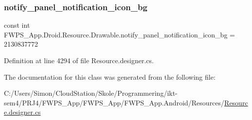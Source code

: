 \subsubsection{\texorpdfstring{notify\+\_\+panel\+\_\+notification\+\_\+icon\+\_\+bg}{notify\_panel\_notification\_icon\_bg}}
{\footnotesize\ttfamily const int F\+W\+P\+S\+\_\+\+App.\+Droid.\+Resource.\+Drawable.\+notify\+\_\+panel\+\_\+notification\+\_\+icon\+\_\+bg = 2130837772}



Definition at line 4294 of file Resource.\+designer.\+cs.



The documentation for this class was generated from the following file\+:\begin{DoxyCompactItemize}
\item 
C\+:/\+Users/\+Simon/\+Cloud\+Station/\+Skole/\+Programmering/ikt-\/sem4/\+P\+R\+J4/\+F\+W\+P\+S\+\_\+\+App/\+F\+W\+P\+S\+\_\+\+App/\+F\+W\+P\+S\+\_\+\+App.\+Android/\+Resources/\mbox{\hyperlink{_resource_8designer_8cs}{Resource.\+designer.\+cs}}\end{DoxyCompactItemize}

